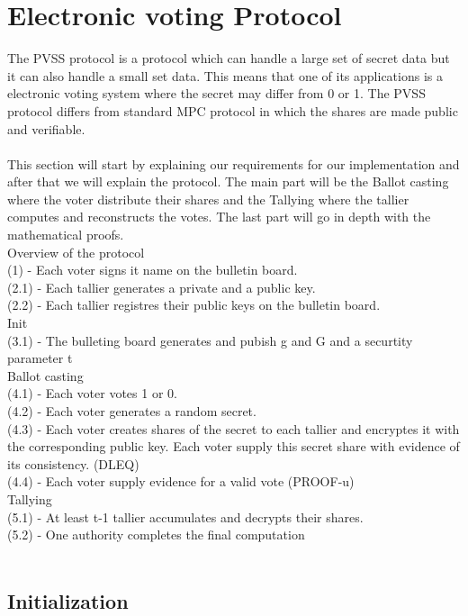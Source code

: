 \section{Electronic voting Protocol}
The PVSS protocol is a protocol which can handle a large set of secret data but it can also handle a small set data. This means that one of its applications is a  electronic voting system where the secret may differ from 0 or 1. The PVSS protocol differs from standard MPC protocol in which the shares are made public and verifiable.\\\\
This section will start by explaining our requirements for our implementation and after that we will explain the protocol. The main part will be the Ballot casting where the voter distribute their shares and the Tallying where the tallier computes and reconstructs the votes. The last part will go in depth with the mathematical proofs. \\

\noindent
Overview of the protocol\\
(1) - Each voter signs it name on the bulletin board.\\
(2.1) - Each tallier generates a private and a public key.\\
(2.2) - Each tallier registres their public keys on the bulletin board.\\
Init\\
(3.1) - The bulleting board generates and pubish g and G and a securtity parameter t\\
Ballot casting\\
(4.1) - Each voter votes 1 or 0.\\
(4.2) - Each voter generates a random secret.\\
(4.3) - Each voter creates shares of the secret to each tallier and encryptes it with the corresponding public key. Each voter supply this secret share with evidence of its consistency. (DLEQ)\\
(4.4) - Each voter supply evidence for a valid vote (PROOF-u)\\
Tallying\\
(5.1) - At least t-1 tallier accumulates and decrypts their shares.\\
(5.2) - One authority completes the final computation \\\\


\subsection{Initialization}










